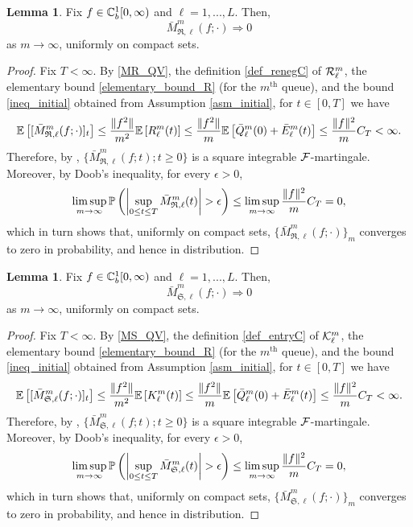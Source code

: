 \documentclass{article}
\theoremstyle{definition}
\newtheorem{lemma}[theorem]{Lemma}
\numberwithin{equation}{section}
\begin{document}
\begin{lemma}\label{lem_MRconv}
Fix  $f\in\mathbb{C}_b^{1}[0,\infty)$ and $\ell=1,...,L$. Then,
\[
\bar M^m_{\mathfrak{R},\ell}(f;\cdot) \Rightarrow 0
\]
as $m\to\infty$, uniformly on compact sets.
\end{lemma}
\begin{proof}
Fix $T<\infty.$ By \eqref{MR_QV}, the definition \eqref{def_renegC} of $\mathcal{R}_\ell^m$, the elementary bound \eqref{elementary_bound_R} (for the $m^{\text{th}}$ queue), and the bound \eqref{ineq_initial} obtained from Assumption \ref{asm_initial}, for $t\in[0,T]$ we have
\[
    \mathbb{E}\left[[\bar M^m_{\mathfrak{R},\ell}(f;\cdot)]_t\right] \leq \frac{\|f^2\|}{m^2}\mathbb{E}\left[R_\ell^m(t)\right] \leq \frac{\|f^2\|}{m}
    \mathbb{E}\left[\bar Q_\ell^m(0)+\bar E_\ell^m(t)\right]\leq  \frac{\|f\|^2}{m} C_T<\infty.
\]
Therefore, by \cite[Theorem 7.35]{klebBook}, $\{\bar M^m_{\mathfrak{R},\ell}(f;t);t\geq0\}$ is a square integrable $\mathcal{F}$-martingale. Moreover, by Doob's inequality, for every $\epsilon >0$,
\[
  \limsup_{m\to\infty}\Prob{\left| \sup_{0\leq t\leq T} \bar M^m_{\mathfrak{R},\ell}(t)\right|> \epsilon} \leq \limsup_{m\to\infty} \frac{\|f\|^2}{m} C_T=0,
\]
which in turn shows that, uniformly on compact sets,  $\{\bar M^m_{\mathfrak{R},\ell}(f;\cdot)\}_m$ converges to zero in probability, and hence  in distribution.
\end{proof}


\begin{lemma}\label{lem_MSconv}
Fix  $f\in\mathbb{C}_b^{1}[0,\infty)$ and $\ell=1,...,L$. Then,
\[
\bar M^m_{\mathfrak{S},\ell}(f;\cdot) \Rightarrow 0
\]
as $m\to\infty$, uniformly on compact sets.
\end{lemma}
\begin{proof}
Fix $T<\infty.$ By \eqref{MS_QV}, the definition \eqref{def_entryC} of $\mathcal{K}_\ell^m$, the elementary bound \eqref{elementary_bound_R} (for the $m^{\text{th}}$ queue), and the bound \eqref{ineq_initial} obtained from Assumption \ref{asm_initial}, for $t\in[0,T]$ we have
\[
    \mathbb{E}\left[[\bar M^m_{\mathfrak{S},\ell}(f;\cdot)]_t\right] \leq \frac{\|f^2\|}{m^2}\mathbb{E}\left[K_\ell^m(t)\right] \leq \frac{\|f^2\|}{m}
    \mathbb{E}\left[\bar Q_\ell^m(0)+\bar E_\ell^m(t)\right]\leq  \frac{\|f\|^2}{m} C_T<\infty.
\]
Therefore, by \cite[Theorem 7.35]{klebBook}, $\{\bar M^m_{\mathfrak{S},\ell}(f;t);t\geq0\}$ is a square integrable $\mathcal{F}$-martingale. Moreover, by Doob's inequality, for every $\epsilon >0$,
\[
  \limsup_{m\to\infty}\Prob{\left| \sup_{0\leq t\leq T} \bar M^m_{\mathfrak{S},\ell}(t)\right|> \epsilon} \leq \limsup_{m\to\infty} \frac{\|f\|^2}{m} C_T=0,
\]
which in turn shows that, uniformly on compact sets,  $\{\bar M^m_{\mathfrak{S},\ell}(f;\cdot)\}_m$ converges to zero in probability, and hence  in distribution.
\end{proof}
\end{document}
